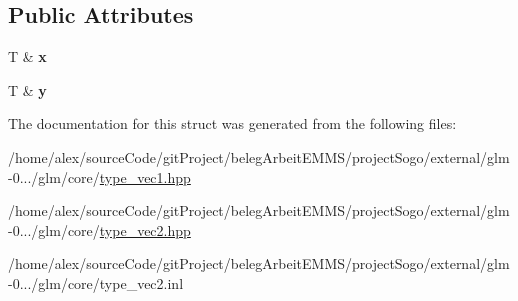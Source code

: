 \subsection*{Public Attributes}
\begin{DoxyCompactItemize}
\item 
\hypertarget{structglm_1_1detail_1_1tref2_af28062fb8ed711515c0beb853a8a968f}{T \& {\bfseries x}}\label{structglm_1_1detail_1_1tref2_af28062fb8ed711515c0beb853a8a968f}

\item 
\hypertarget{structglm_1_1detail_1_1tref2_af2a3e1e998dac26176c0e26ffb9365be}{T \& {\bfseries y}}\label{structglm_1_1detail_1_1tref2_af2a3e1e998dac26176c0e26ffb9365be}

\end{DoxyCompactItemize}


The documentation for this struct was generated from the following files\-:\begin{DoxyCompactItemize}
\item 
/home/alex/source\-Code/git\-Project/beleg\-Arbeit\-E\-M\-M\-S/project\-Sogo/external/glm-\/0.../glm/core/\hyperlink{type__vec1_8hpp}{type\-\_\-vec1.\-hpp}\item 
/home/alex/source\-Code/git\-Project/beleg\-Arbeit\-E\-M\-M\-S/project\-Sogo/external/glm-\/0.../glm/core/\hyperlink{type__vec2_8hpp}{type\-\_\-vec2.\-hpp}\item 
/home/alex/source\-Code/git\-Project/beleg\-Arbeit\-E\-M\-M\-S/project\-Sogo/external/glm-\/0.../glm/core/type\-\_\-vec2.\-inl\end{DoxyCompactItemize}
